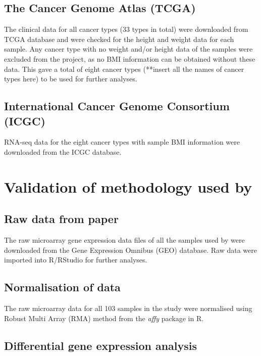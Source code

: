 \subsection{The Cancer Genome Atlas (TCGA)}

The clinical data for all cancer types (33 types in total) were downloaded from TCGA database and were checked for the height and weight data for each sample.
Any cancer type with no weight and/or height data of the samples were excluded from the project, as no BMI information can be obtained without these data.
This gave a total of eight cancer types (**insert all the names of cancer types here) to be used for further analyses.

\subsection{International Cancer Genome Consortium (ICGC)}

RNA-seq data for the eight cancer types with sample BMI information were downloaded from the ICGC database.

\section{Validation of methodology used by \citet{Creighton2012}}

\subsection{Raw data from \citet{Creighton2012} paper}

The raw microarray gene expression data files of all the samples used by \citet{Creighton2012} were downloaded from the Gene Expression Omnibus (GEO) database.
Raw data were imported into R/RStudio for further analyses.

\subsection{Normalisation of \citet{Creighton2012} data}

The raw microarray data for all 103 samples in the study were normalised using Robust Multi Array (RMA) method from the \textit{affy} package in R.

\subsection{Differential gene expression analysis}

